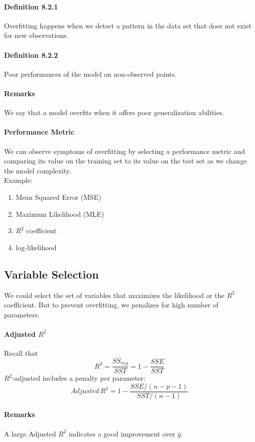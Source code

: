 \documentclass[11pt]{article}
\begin{document}
\paragraph{Definition 8.2.1}
Overfitting happens when we detect a pattern in the data set that does not exist for new observations.
\paragraph{Definition 8.2.2}
Poor performances of the model on non-observed points.
\paragraph{Remarks}
We say that a model overfits when it offers poor generalization abilities. 
\paragraph{Performance Metric}
We can observe symptoms of overfitting by selecting a performance metric and comparing its value on the training set to its value on the test set as we change the model complexity.\\
Example:
\begin{enumerate}
	\item Mean Squared Error (MSE)
	\item Maximum Likelihood (MLE)
	\item $R^2$ coefficient
	\item log-likelihood
\end{enumerate} 
\subsection{Variable Selection}
We could select the set of variables that maximizes the likelihood or the $R^2$ coefficient. But to prevent overfitting, we penalizes for high number of parameters.
\paragraph{Adjusted $R^2$}
Recall that $$R^2 = \frac{SS_{reg}}{SST} = 1 - \frac{SSE}{SST}$$
$R^2$-adjusted includes a penalty per parameter:
$$Adjusted \, R^2 = 1 - \frac{SSE/(n-p-1)}{SST/(n-1)}$$
\paragraph{Remarks}
A large Adjusted $R^2$ indicates a good improvement over $\bar{y}$.
\end{document}
